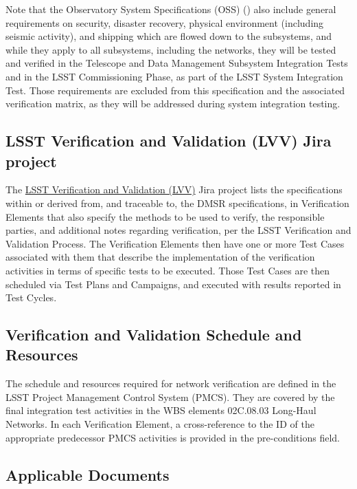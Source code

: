 \documentclass[DM,lsstdraft,STS,toc]{lsstdoc}
\begin{document}
Note that the Observatory System Specifications (OSS) () also include general requirements on security, disaster recovery, physical environment (including seismic activity), and shipping which are flowed down to the subsystems, and while they apply to all subsystems, including the networks, they will be tested and verified in the Telescope and Data Management Subsystem Integration Tests and in the LSST Commissioning Phase, as part of the LSST System Integration Test.
Those requirements are excluded from this specification and the associated verification matrix, as they will be addressed during system integration testing.

\subsection{LSST Verification and Validation (LVV) Jira project}\label{sec:lvv}

The \href{https://jira.lsstcorp.org/projects/LVV/}{LSST Verification and Validation (LVV)} Jira project lists the specifications within or derived from, and traceable to, the DMSR specifications, in Verification Elements that also specify the methods to be used to verify, the responsible parties, and additional notes regarding verification, per the  LSST Verification and Validation Process.
The Verification Elements then have one or more Test Cases associated with them that describe the implementation of the verification activities in terms of specific tests to be executed.
Those Test Cases are then scheduled via Test Plans and Campaigns, and executed with results reported in Test Cycles.

\subsection{Verification and Validation Schedule and Resources}\label{sec:schedule}

The schedule and resources required for network verification are defined in the LSST Project Management Control System (PMCS).
They are covered by the final integration test activities in the WBS elements 02C.08.03 Long-Haul Networks.
In each Verification Element, a cross-reference to the ID of the appropriate predecessor PMCS activities is provided in the pre-conditions field.


\subsection{Applicable Documents}
\label{sec:docs}
\end{document}

